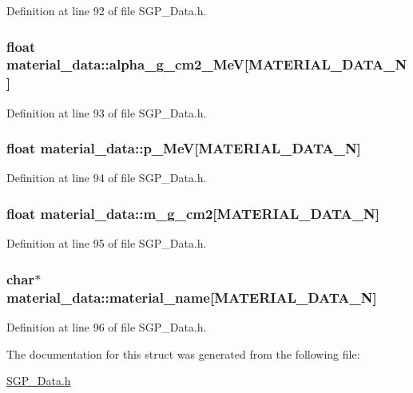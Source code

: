 Definition at line 92 of file SGP\_\-Data.h.\hypertarget{structmaterial__data_ccf93507c8fdafb2e4a1ab1edfe2aa7e}{
\subsubsection[alpha\_\-g\_\-cm2\_\-MeV]{\setlength{\rightskip}{0pt plus 5cm}float {\bf material\_\-data::alpha\_\-g\_\-cm2\_\-MeV}\mbox{[}MATERIAL\_\-DATA\_\-N\mbox{]}}}
\label{de/d38/structmaterial__data_ccf93507c8fdafb2e4a1ab1edfe2aa7e}




Definition at line 93 of file SGP\_\-Data.h.\hypertarget{structmaterial__data_929cba0ae67c07bb2080dacb8ebafa08}{
\subsubsection[p\_\-MeV]{\setlength{\rightskip}{0pt plus 5cm}float {\bf material\_\-data::p\_\-MeV}\mbox{[}MATERIAL\_\-DATA\_\-N\mbox{]}}}
\label{de/d38/structmaterial__data_929cba0ae67c07bb2080dacb8ebafa08}




Definition at line 94 of file SGP\_\-Data.h.\hypertarget{structmaterial__data_2be24c819e1bb262cf0079c6d7f296c2}{
\subsubsection[m\_\-g\_\-cm2]{\setlength{\rightskip}{0pt plus 5cm}float {\bf material\_\-data::m\_\-g\_\-cm2}\mbox{[}MATERIAL\_\-DATA\_\-N\mbox{]}}}
\label{de/d38/structmaterial__data_2be24c819e1bb262cf0079c6d7f296c2}




Definition at line 95 of file SGP\_\-Data.h.\hypertarget{structmaterial__data_f0d28c3429e16c05785876ab2f955eda}{
\subsubsection[material\_\-name]{\setlength{\rightskip}{0pt plus 5cm}char$\ast$ {\bf material\_\-data::material\_\-name}\mbox{[}MATERIAL\_\-DATA\_\-N\mbox{]}}}
\label{de/d38/structmaterial__data_f0d28c3429e16c05785876ab2f955eda}




Definition at line 96 of file SGP\_\-Data.h.

The documentation for this struct was generated from the following file:\begin{CompactItemize}
\item 
\hyperlink{SGP__Data_8h}{SGP\_\-Data.h}\end{CompactItemize}
